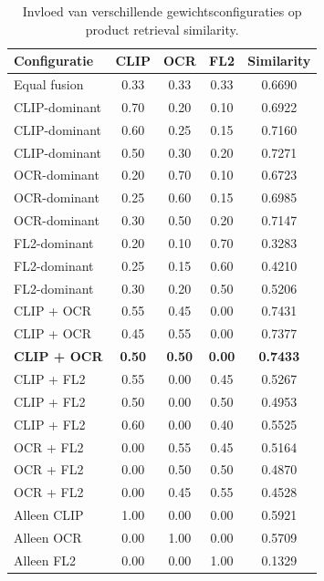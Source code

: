 \begin{table}[H]
\centering
\caption{Invloed van verschillende gewichtsconfiguraties op product retrieval similarity.}
\label{tab:fusion_weights}
\begin{tabular}{lcccc}
\toprule
\textbf{Configuratie} & \textbf{CLIP} & \textbf{OCR} & \textbf{FL2} & \textbf{Similarity} \\
\midrule
Equal fusion                       & 0.33 & 0.33 & 0.33 & 0.6690 \\

CLIP-dominant                      & 0.70 & 0.20 & 0.10 & 0.6922 \\
CLIP-dominant                      & 0.60 & 0.25 & 0.15 & 0.7160 \\
CLIP-dominant                      & 0.50 & 0.30 & 0.20 & 0.7271 \\

OCR-dominant                       & 0.20 & 0.70 & 0.10 & 0.6723 \\
OCR-dominant                       & 0.25 & 0.60 & 0.15 & 0.6985 \\
OCR-dominant                       & 0.30 & 0.50 & 0.20 & 0.7147 \\

FL2-dominant                       & 0.20 & 0.10 & 0.70 & 0.3283 \\
FL2-dominant                       & 0.25 & 0.15 & 0.60 & 0.4210 \\
FL2-dominant                       & 0.30 & 0.20 & 0.50 & 0.5206 \\

CLIP + OCR                         & 0.55 & 0.45 & 0.00 & 0.7431 \\
CLIP + OCR                         & 0.45 & 0.55 & 0.00 & 0.7377 \\
\textbf{CLIP + OCR}                & \textbf{0.50} & \textbf{0.50} & \textbf{0.00} & \textbf{0.7433} \\

CLIP + FL2                         & 0.55 & 0.00 & 0.45 & 0.5267 \\
CLIP + FL2                         & 0.50 & 0.00 & 0.50 & 0.4953 \\
CLIP + FL2                         & 0.60 & 0.00 & 0.40 & 0.5525 \\

OCR + FL2                          & 0.00 & 0.55 & 0.45 & 0.5164 \\
OCR + FL2                          & 0.00 & 0.50 & 0.50 & 0.4870 \\
OCR + FL2                          & 0.00 & 0.45 & 0.55 & 0.4528 \\

Alleen CLIP                        & 1.00 & 0.00 & 0.00 & 0.5921 \\
Alleen OCR                         & 0.00 & 1.00 & 0.00 & 0.5709 \\
Alleen FL2                         & 0.00 & 0.00 & 1.00 & 0.1329 \\
\bottomrule
\end{tabular}
\end{table}

